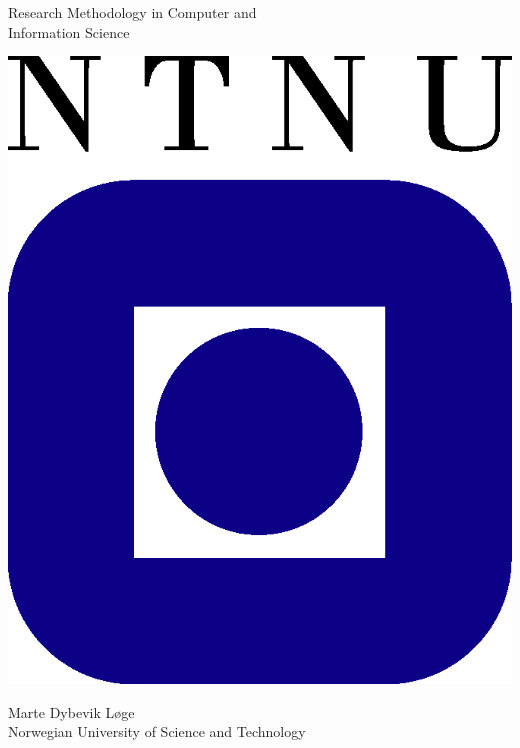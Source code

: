 \begin{titlepage}
\begin{center}

    
  {\Huge Research Methodology in Computer and}\\[0.3cm]
  {\Huge Information Science} \\


  
  \vspace{3.0cm}

  \includegraphics{ntnu-logo2.png}

  \vspace{4.0cm}

  {\Large Marte Dybevik Løge} \\ [0.5cm]
  {\Large Norwegian University of Science and Technology}\\

  \vspace{4cm}

 


\end{center}
\end{titlepage}